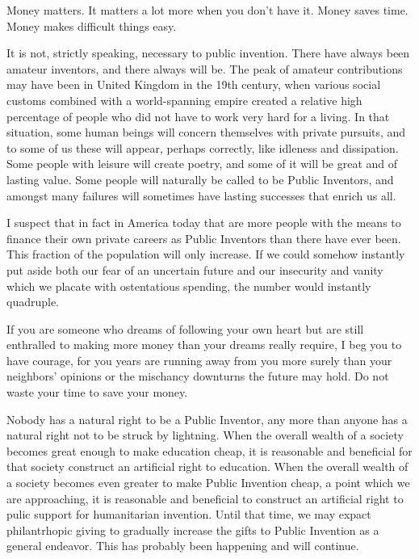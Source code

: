 \documentclass[
	fontsize=10pt, %
	twoside=false, %
	secnumdepth=1, %
]{kaobook}
\begin{document}
Money matters. It matters a lot more when you don't have it.
Money saves time. Money makes difficult things easy.

It is not, strictly speaking, necessary to public invention.
There have always been amateur inventors, and there always will be.
The peak of amateur contributions may have been in United Kingdom in the
19th century, when various social customs combined with a world-spanning
empire created a relative high percentage of people who did not have
to work very hard for a living. In that situation, some human beings
will concern themselves with private pursuits, and to some of us
these will appear, perhaps correctly, like idleness and dissipation.
Some people with leisure will create poetry,
and some of it will be great and of lasting value.
Some people will naturally be called to be Public Inventors, and
amongst many failures will sometimes have lasting successes
that enrich us all.

I suspect that in fact in America today that are more people
with the means to finance their own private careers as Public Inventors
than there have ever been. This fraction of the population will
only increase. If we could somehow instantly put aside both our
fear of an uncertain future and our insecurity and vanity which
we placate with ostentatious spending, the number would instantly
quadruple.

If you are someone who dreams of following your own heart but
are still enthralled to making more money than your dreams really
require, I beg you to have courage, for you years are running
away from you more surely than your neighbors' opinions or the
mischancy downturns the future may hold. Do not waste your
time to save your money.

Nobody has a natural right to be a Public Inventor, any more than
anyone has a natural right not to be struck by lightning.
When the overall wealth of a society becomes great enough to make
education cheap, it is reasonable and beneficial for that society construct an
artificial right to education. When the overall wealth of a society
becomes even greater to make Public Invention cheap, a point which
we are approaching, it is reasonable and beneficial to construct
an artificial right to pulic support for humanitarian invention.
Until that time, we may expact philantrhopic giving to gradually
increase the gifts to Public Invention as a general endeavor.
This has probably been happening and will continue.
\end{document}
